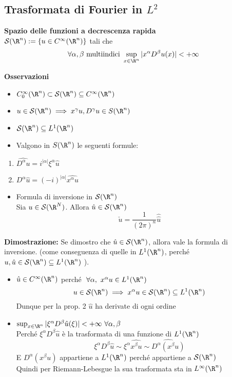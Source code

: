 \subsection{Trasformata di Fourier in $L^2$ }
\begin{tcolorbox}
\textbf{Spazio delle funzioni a decrescenza rapida}
\\$\mathcal S(\R^n):= \{u\in C^\infty(\R^n)\} $ tali che 
\[ \forall \alpha, \beta\text{ multiindici }\sup_{x\in \R^n}|x^\alpha D^\beta u(x)|<+\infty\]
\end{tcolorbox}
\textbf{Osservazioni} 
\begin{itemize}
	\item $C^\infty_0(\R^n)\subset \mathcal S(\R^n)\subseteq  C^\infty(\R^n)$ 
	\item $u\in \mathcal S(\R^n)\implies x^\gamma u, D^\gamma u\in S(\R^n)$ 
	\item $\mathcal S(\R^n) \subseteq  L^{1}(\R^n)$
	\item Valgono in $S(\R^n)$ le seguenti formule:
\end{itemize}
\begin{enumerate}
	\item $\widehat{D^\alpha u}=i^{|\alpha|}\xi^\alpha \hat{u}$ 
	\item $D^\alpha \hat{u}=(-i)^{|\alpha|}\widehat{x^\alpha u}$
\end{enumerate}
\begin{itemize}
	\item Formula di inversione in $\mathcal S(\R^n)$ 
		\\Sia $u\in \mathcal S(\R^N)$. Allora $\hat{u}\in \mathcal S(\R^n)$ 
		\[\check u=\frac{1}{(2\pi)^n}\hat{\hat{u}}\]
\end{itemize}
\textbf{Dimostrazione: }Se dimostro che $\hat{u}\in \mathcal S(\R^n)$, allora vale la formula di inversione. (come conseguenza di quelle in $L^{1}(\R^n)$, perché $u,\hat{u}\in \mathcal S(\R^n)\subseteq  L^{1}(\R^n)$ ).
\begin{itemize}
	\item $\hat{u}\in C^\infty(\R^n) $ perché $\ \forall \alpha,\ x^\alpha u \in L^{1}(\R^n)$
		\[u\in \mathcal S(\R^n)\implies x^\alpha u \in \mathcal S(\R^n)\subseteq  L^{1}(\R^n)\]
		Dunque per la prop. 2 $\hat{u}$ ha derivate di ogni ordine
	\item $\sup_{x\in \R^n}|\xi^\alpha D^\beta \hat{u}(\xi)|<+\infty\ \forall \alpha,\beta$
		\\Perché $\xi^\alpha D^\beta \hat{u}$ è la trasformata di una funzione di $L^{1}(\R^n)$ 
		\[\xi^\alpha D^\beta \hat{u}\sim \xi^\alpha \widehat{x^\beta u}\sim \widehat{D^\alpha (x^\beta u)}\]
	E $D^\alpha(x^\beta u)$ appartiene a $L^{1}(\R^n)$ perché appartiene a $\mathcal S(\R^n)$ 
	\\Quindi per Riemann-Lebesgue la sua trasformata sta in $L^{\infty}(\R^n)$

\end{itemize}
